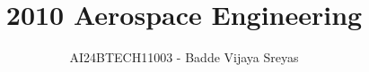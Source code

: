 \documentclass[journal]{IEEEtran}
\begin{document}

\vspace{3cm}

\title{2010 Aerospace Engineering}
\author{AI24BTECH11003 - Badde Vijaya Sreyas}
{\let\newpage\relax\maketitle}

\renewcommand{\thefigure}{\theenumi}
\renewcommand{\thetable}{\theenumi}
\setlength{\intextsep}{10pt} %


\renewcommand{\thetable}{\theenumi}
\end{document}
